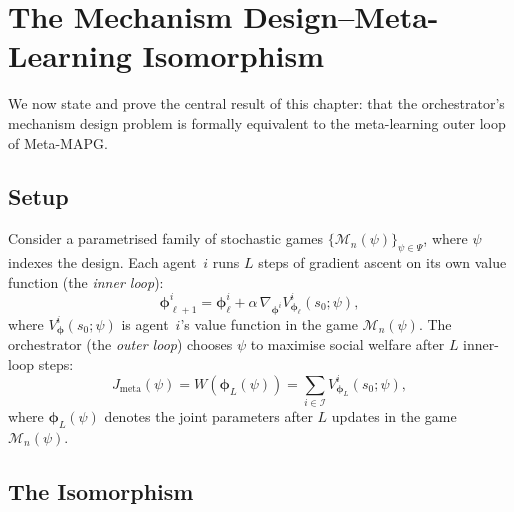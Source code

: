 \section{The Mechanism Design--Meta-Learning Isomorphism}
\label{sec:md-ml-iso}

We now state and prove the central result of this chapter: that the orchestrator's mechanism design problem is formally equivalent to the meta-learning outer loop of Meta-MAPG.

\subsection{Setup}
\label{subsec:iso-setup}

Consider a parametrised family of stochastic games $\{\mathcal{M}_n(\psi)\}_{\psi\in\Psi}$, where $\psi$ indexes the design. Each agent~$i$ runs $L$ steps of gradient ascent on its own value function (the \emph{inner loop}):
\begin{equation}\label{eq:inner-loop-designed}
  \bm{\phi}^i_{\ell+1} = \bm{\phi}^i_\ell + \alpha\,\nabla_{\bm{\phi}^i} V^i_{\bm{\phi}_\ell}(s_0;\psi),
\end{equation}
where $V^i_{\bm{\phi}}(s_0;\psi)$ is agent~$i$'s value function in the game $\mathcal{M}_n(\psi)$. The orchestrator (the \emph{outer loop}) chooses $\psi$ to maximise social welfare after $L$ inner-loop steps:
\begin{equation}\label{eq:meta-objective}
  J_{\mathrm{meta}}(\psi) = W\!\left(\bm{\phi}_L(\psi)\right) = \sum_{i\in\mathcal{I}} V^i_{\bm{\phi}_L}(s_0;\psi),
\end{equation}
where $\bm{\phi}_L(\psi)$ denotes the joint parameters after $L$ updates in the game $\mathcal{M}_n(\psi)$.

\subsection{The Isomorphism}
\label{subsec:isomorphism}

